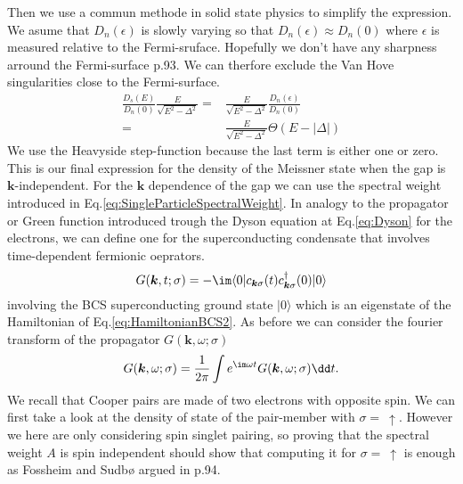 \documentclass[../main.tex]{subfile}
\begin{document}
Then we use a commun methode in solid state physics to simplify the expression. We asume that $D_n(\epsilon)$ is slowly varying so that $D_n(\epsilon)\approx D_n(0)$
where $\epsilon$ is measured relative to the Fermi-sruface. Hopefully we don't have any sharpness arround the Fermi-surface \cite{FossheimSudbo2004} p.93. 
We can therfore exclude the Van Hove singularities close to the Fermi-surface.
\begin{align*}
    \frac{D_s(E)}{D_n(0)} \frac{E}{\sqrt{E^2-\Delta^2}} =& \frac{E}{\sqrt{E^2-\Delta^2}}\frac{D_n(\epsilon)}{D_n(0)}\\
    =&\frac{E}{\sqrt{E^2-\Delta^2}} \Theta (E- |\Delta|)
\end{align*}
We use the Heavyside step-function because the last term is either one or zero. This is our final expression for the density of the Meissner 
state when the gap is $\bm{k}$-independent.
For the $\bm{k}$ dependence of the gap we can use the spectral weight introduced in Eq.\ref{eq:SingleParticleSpectralWeight}.
In analogy to the propagator or Green function introduced trough the Dyson equation at Eq.\ref{eq:Dyson} for the electrons, we can define one for the 
superconducting condensate that involves time-dependent fermionic oeprators.
\[
    G(\bm{k}, t; \sigma) = - \im \langle 0 | c_{\bm{k}\sigma}(t) c_{\bm{k}\sigma}^{\dagger}(0) | 0 \rangle
\]
involving the BCS superconducting ground state $|0\rangle$ which is an eigenstate of the Hamiltonian of Eq.\ref{eq:HamiltonianBCS2}. As before we can consider
the fourier transform of the propagator $G(\bm{k}, \omega; \sigma)$  
\[
    G(\bm{k}, \omega; \sigma) = \frac{1}{2\pi} \int e^{\im\omega t} G(\bm{k}, \omega; \sigma)\dd t.
\] 
We recall that Cooper pairs are made of two electrons with opposite spin. We can first take a 
look at the density of state of the pair-member with $\sigma =~ \uparrow$. 
However we here are only considering spin singlet pairing, so proving that the spectral weight $A$ is spin independent should
show that computing it for $\sigma =~ \uparrow$ is enough as Fossheim and Sudbø argued in \cite{FossheimSudbo2004} p.94.\\
\end{document}
